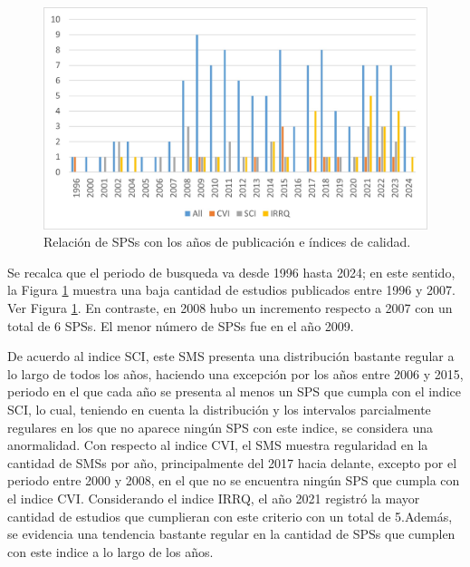\begin{figure}[htbp]
	\centering
	\vspace{10pt}
	\includegraphics[scale=0.7]{resources/figures/SPSsBYearsAndIndexes.jpg}
	\vspace{6pt}
	\caption{Relación de SPSs con los años de publicación e índices de calidad.}
	\label{fig:SPSsByYearsAndIndexes}
\end{figure}

Se recalca que el periodo de busqueda va desde 1996 hasta 2024; en este sentido, la Figura \ref{fig:SPSsByYearsAndIndexes} muestra una baja cantidad de estudios publicados entre 1996 y 2007. Ver Figura \ref{fig:SPSsByYearsAndIndexes}. En contraste, en 2008 hubo un incremento respecto a 2007 con un total de 6 SPSs. El menor número de SPSs fue en el año 2009.

De acuerdo al indice SCI, este SMS presenta una distribución bastante regular a lo largo de todos los años, haciendo una excepción por los años entre 2006 y 2015, periodo en el que cada año se presenta al menos un SPS que cumpla con el indice SCI, lo cual, teniendo en cuenta la distribución y los intervalos parcialmente regulares en los que no aparece ningún SPS con este indice, se considera una anormalidad. Con respecto al indice CVI, el SMS muestra regularidad en la cantidad de SMSs por año, principalmente del 2017 hacia delante, excepto por el periodo entre 2000 y 2008, en el que no se encuentra ningún SPS que cumpla con el indice CVI. Considerando el indice IRRQ, el año 2021 registró la mayor cantidad de estudios que cumplieran con este criterio con un total de 5.Además, se evidencia una tendencia bastante regular en la cantidad de SPSs que cumplen con este indice a lo largo de los años.

